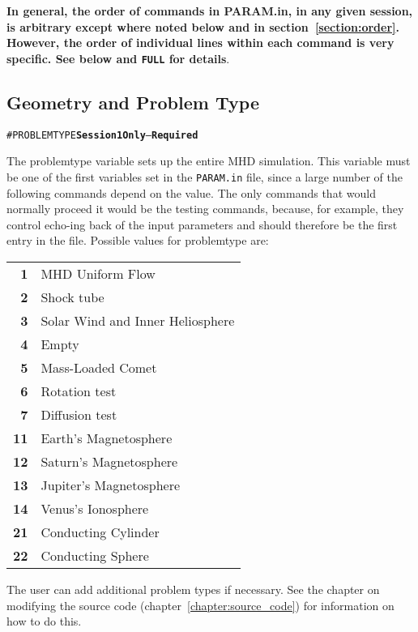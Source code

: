 {\bf In general, the order of commands in PARAM.in, in any given session,
 is arbitrary except where noted below and in section~\ref{section:order}.  
However, the order of individual lines within each command is very specific.
See below and {\tt FULL} for details}.



\subsection{Geometry and Problem Type \label{section:geometry}} 

\begin{alltt}
#PROBLEMTYPE      \hfill {\bf Session 1 Only} -- {\bf Required}
\end{alltt}

The problemtype variable sets up the entire MHD simulation.  This
variable must be one of the first variables set in the {\tt PARAM.in}
file, since a large number of the following commands depend on the value.
The only commands that would normally proceed it would be the testing
commands, because, for example, they control echo-ing back of the 
input parameters and should therefore be the first entry in the file.
Possible values for problemtype are:
\begin{tabular}{rl}
{\bf 1} & MHD Uniform Flow\\
{\bf 2} &  Shock tube\\
{\bf 3} & Solar Wind and Inner Heliosphere\\
{\bf 4} & Empty\\
{\bf 5} & Mass-Loaded Comet\\
{\bf 6} & Rotation test \\
{\bf 7} & Diffusion test \\
{\bf 11} & Earth's Magnetosphere\\
{\bf 12} & Saturn's Magnetosphere\\
{\bf 13} & Jupiter's Magnetosphere \\
{\bf 14} & Venus's Ionosphere \\
{\bf 21} & Conducting Cylinder\\
{\bf 22} & Conducting Sphere\\
\end{tabular}

The user can add additional problem types if necessary.  See the chapter on
modifying the source code (chapter~\ref{chapter:source_code})
for information on how to do this.
\ \ \\

